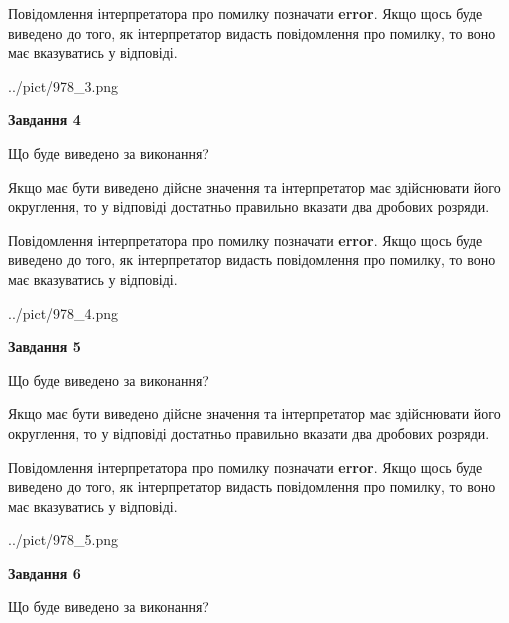 \documentclass[12pt, ukrainian]{article}
\begin{document}
{\begin {Large}
Повідомлення інтерпретатора про помилку позначати \textbf{error}.
Якщо щось буде виведено до того, як інтерпретатор видасть повідомлення про помилку, 
то воно має вказуватись у відповіді. \par

\begin{center}
	{../pict/978_3.png}
\end{center}
\newpage

{\begin {center}\textbf{Завдання 4}\end {center}}\par
Що буде виведено за виконання? \par

Якщо має бути виведено дійсне значення та інтерпретатор має здійснювати його округлення, 
то у відповіді достатньо правильно вказати два дробових розряди.

Повідомлення інтерпретатора про помилку позначати \textbf{error}.
Якщо щось буде виведено до того, як інтерпретатор видасть повідомлення про помилку, 
то воно має вказуватись у відповіді. \par

\begin{center}
	{../pict/978_4.png}
\end{center}
\newpage

{\begin {center}\textbf{Завдання 5}\end {center}}\par
Що буде виведено за виконання? \par

Якщо має бути виведено дійсне значення та інтерпретатор має здійснювати його округлення, 
то у відповіді достатньо правильно вказати два дробових розряди.

Повідомлення інтерпретатора про помилку позначати \textbf{error}.
Якщо щось буде виведено до того, як інтерпретатор видасть повідомлення про помилку, 
то воно має вказуватись у відповіді. \par

\begin{center}
	{../pict/978_5.png}
\end{center}
\newpage

{\begin {center}\textbf{Завдання 6}\end {center}}\par
Що буде виведено за виконання? \par


\end{Large}}
\end{document}
